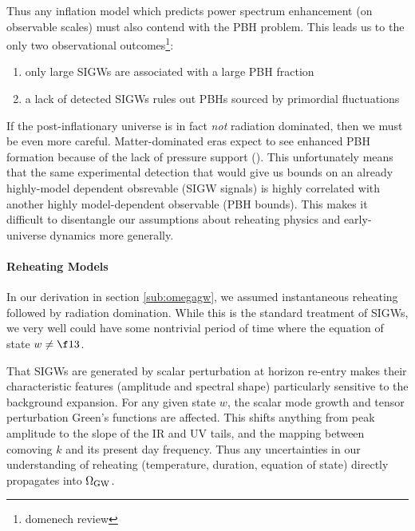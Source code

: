 Thus any inflation model which predicts power spectrum enhancement (on observable scales) must also contend with the PBH problem. This leads us to the only two observational outcomes\footnote{domenech review}:
\begin{enumerate}
    \item only large SIGWs are associated with a large PBH fraction
    \item a lack of detected SIGWs rules out PBHs sourced by primordial fluctuations
\end{enumerate}

If the post-inflationary universe is in fact \textit{not} radiation dominated, then we must be even more careful. Matter-dominated eras expect to see enhanced PBH formation because of the lack of pressure support (). This unfortunately means that the same experimental detection that would give us bounds on an already highly-model dependent obsrevable (SIGW signals) is highly correlated with another highly model-dependent observable (PBH bounds). This makes it difficult to disentangle our assumptions about reheating physics and early-universe dynamics more generally.


\paragraph{Reheating Models}
In our derivation in section \ref{sub:omegagw}, we assumed instantaneous reheating followed by radiation domination. While this is the standard treatment of SIGWs, we very well could have some nontrivial period of time where the equation of state $w\neq\f13$. 

That SIGWs are generated by scalar perturbation at horizon re-entry makes their characteristic features (amplitude and spectral shape) particularly sensitive to the background expansion. For any given state $w$, the scalar mode growth and tensor perturbation Green's functions are affected. This shifts anything from peak amplitude to the slope of the IR and UV tails, and the mapping between comoving $k$ and its present day frequency. Thus any uncertainties in our understanding of reheating (temperature, duration, equation of state) directly propagates into $\Omega_{\rm GW}$.

